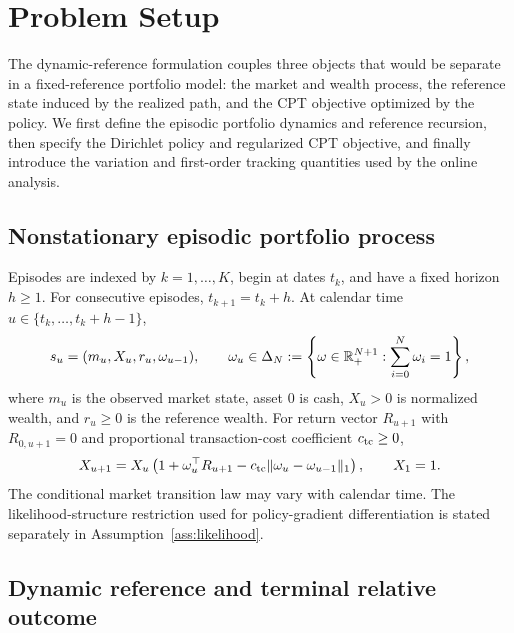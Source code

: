 \section{Problem Setup}\label{sec:setup}

The dynamic-reference formulation couples three objects that would be separate in a fixed-reference portfolio model: the market and wealth process, the reference state induced by the realized path, and the CPT objective optimized by the policy.  We first define the episodic portfolio dynamics and reference recursion, then specify the Dirichlet policy and regularized CPT objective, and finally introduce the variation and first-order tracking quantities used by the online analysis.

\subsection{Nonstationary episodic portfolio process}

Episodes are indexed by $k=1,\ldots,K$, begin at dates $t_k$, and have a fixed horizon $h\ge1$.  For consecutive episodes, $t_{k+1}=t_k+h$.  At calendar time $u\in\{t_k,\ldots,t_k+h-1\}$,
\begin{equation}\label{eq:state-action}
 s_u=(m_u,X_u,r_u,\omega_{u-1}),
 \qquad
 \omega_u\in\Delta_N:=\left\{\omega\in\mathbb R_+^{N+1}:\sum_{i=0}^{N}\omega_i=1\right\},
\end{equation}
where $m_u$ is the observed market state, asset $0$ is cash, $X_u>0$ is normalized wealth, and $r_u\ge0$ is the reference wealth.  For return vector $R_{u+1}$ with $R_{0,u+1}=0$ and proportional transaction-cost coefficient $c_{\rm tc}\ge0$,
\begin{equation}\label{eq:wealth-update}
 X_{u+1}=X_u\left(1+\omega_u^\top R_{u+1}
 -c_{\rm tc}\lVert\omega_u-\omega_{u-1}\rVert_1\right),
 \qquad X_1=1.
\end{equation}
The conditional market transition law may vary with calendar time.  The likelihood-structure restriction used for policy-gradient differentiation is stated separately in Assumption~\ref{ass:likelihood}.

\subsection{Dynamic reference and terminal relative outcome}

